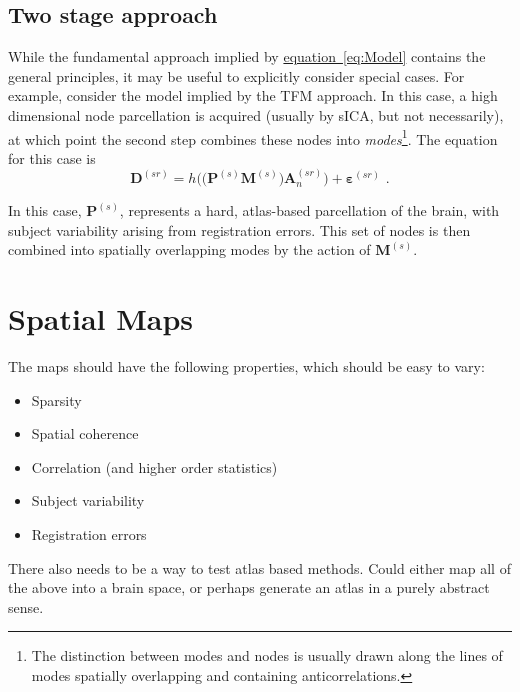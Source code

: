 \documentclass[a4paper, 12pt]{article}
\newcommand*{\Ref}[2][]{\hyperref[#2]{#1~\ref*{#2}}}
\newcommand{\bm}[1]{\mathbf{#1}}
\begin{document}
\subsection{Two stage approach}
\label{sec:ModeModel}
While the fundamental approach implied by \Ref[equation]{eq:Model} contains the general principles, it may be useful to explicitly consider special cases.
For example, consider the model implied by the TFM approach.
In this case, a high dimensional node parcellation is acquired (usually by sICA, but not necessarily), at which point the second step combines these nodes into \emph{modes}\footnote{The distinction between modes and nodes is usually drawn along the lines of modes spatially overlapping and containing anticorrelations.}.
The equation for this case is
\begin{equation}
\bm{D}^{(sr)} = h\Big( \big( \bm{P}^{(s)} \bm{M}^{(s)} \big) \bm{A}_{n}^{(sr)} \Big) + \bm{\varepsilon}^{(sr)} \,\, .
\label{eq:ModeModel}
\end{equation}

In this case, $\bm{P}^{(s)}$, represents a hard, atlas-based parcellation of the brain, with subject variability arising from registration errors.
This set of nodes is then combined into spatially overlapping modes by the action of $\bm{M}^{(s)}$.


\section{Spatial Maps}
\label{sec:Maps}
The maps should have the following properties, which should be easy to vary:
\begin{itemize}
\item{Sparsity}
\item{Spatial coherence}
\item{Correlation (and higher order statistics)}
\item{Subject variability}
\item{Registration errors}
\end{itemize}

There also needs to be a way to test atlas based methods. 
Could either map all of the above into a brain space, or perhaps generate an atlas in a purely abstract sense.
\end{document}
